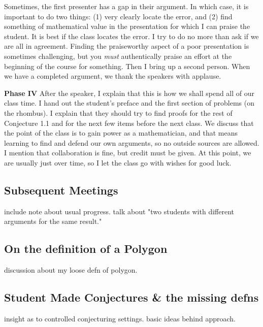 \documentclass{tufte-handout}
\theoremstyle{definition}
\begin{document}
\begin{compactdesc}
Sometimes, the first presenter has a gap in their argument. 
In which case, it is important to do two things: (1) very clearly locate the error, and (2) find something of mathematical value in the presentation for which I can praise the student.
It is best if the class locates the error.
I try to do no more than ask if we are all in agreement.
Finding the praiseworthy aspect of a poor presentation is sometimes challenging, but you \emph{must} authentically praise an effort at the beginning of the course for something.
Then I bring up a second person.
When we have a completed argument, we thank the speakers with applause.\\[.1in]

\item[\textbf{Phase IV}] After the speaker, I explain that this is how we shall spend all of our class time.
I hand out the student's preface and the first section of problems (on the rhombus).
I explain that they should try to find proofs for the rest of Conjecture 1.1 and for the next few items before the next class.
We discuss that the point of the class is to gain power as a mathematician, and that means learning to find and defend our own arguments, so no outside sources are allowed.
I mention that collaboration is fine, but credit must be given.
At this point, we are usually just over time, so I let the class go with wishes for good luck.\\[.1in]
\end{compactdesc}

\subsection{Subsequent Meetings}

include note about usual progress. talk about "two students with different arguments for the same result."

\subsection{On the definition of a Polygon}

discussion about my loose defn of polygon.

\subsection{Student Made Conjectures \& the missing defns}

insight as to controlled conjecturing settings. basic ideas behind approach.
\end{document}
